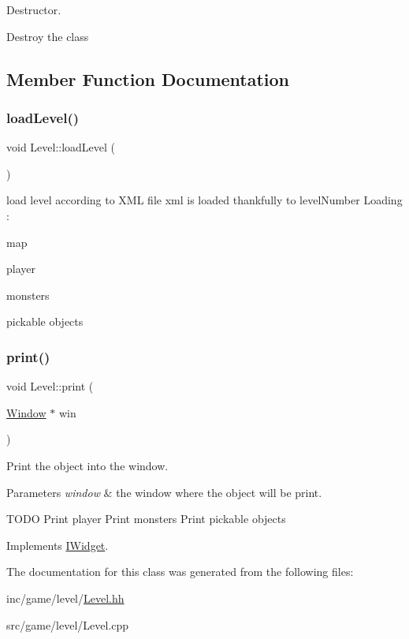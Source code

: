 Destructor. 

Destroy the class 

\subsection{Member Function Documentation}
\mbox{\label{classLevel_aa88db36cd824320cb599d913603dc2a3}} 
\subsubsection{\texorpdfstring{load\+Level()}{loadLevel()}}
{\footnotesize\ttfamily void Level\+::load\+Level (\begin{DoxyParamCaption}{ }\end{DoxyParamCaption})}

load level according to X\+ML file xml is loaded thankfully to level\+Number Loading \+:
\begin{DoxyItemize}
\item map
\item player
\item monsters
\item pickable objects 
\end{DoxyItemize}\mbox{\label{classLevel_ab8311fe64b7957d627053359331b0b6b}} 
\subsubsection{\texorpdfstring{print()}{print()}}
{\footnotesize\ttfamily void Level\+::print (\begin{DoxyParamCaption}\item[{\hyperlink{classWindow}{Window} $\ast$}]{win }\end{DoxyParamCaption})\hspace{0.3cm}{\ttfamily [virtual]}}



Print the object into the window. 


\begin{DoxyParams}{Parameters}
{\em \textquotesingle{}window\textquotesingle{}} & the window where the object will be print. \\
\hline
\end{DoxyParams}
T\+O\+DO Print player Print monsters Print pickable objects

Implements \hyperlink{classIWidget_a0cfa49a402e9bb31808a715e048ab2f4}{I\+Widget}.



The documentation for this class was generated from the following files\+:\begin{DoxyCompactItemize}
\item 
inc/game/level/\hyperlink{Level_8hh}{Level.\+hh}\item 
src/game/level/Level.\+cpp\end{DoxyCompactItemize}
